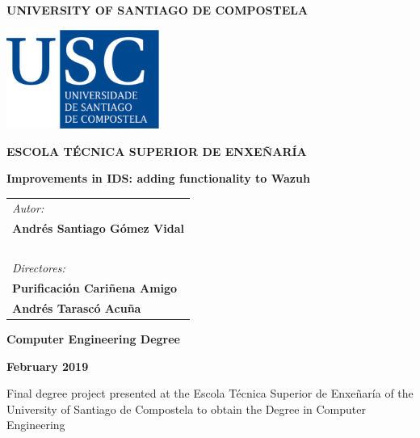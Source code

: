 \pagestyle{empty}
\begin{center}
{\bf\Large UNIVERSITY OF SANTIAGO DE COMPOSTELA}

\vspace{0.5cm}
\includegraphics[width=5cm]{figuras/logo_usc.eps}

\vspace{0.5cm}
{\bf\large ESCOLA TÉCNICA SUPERIOR DE ENXEÑARÍA}

\vspace{2cm}
{\bf\LARGE Improvements in IDS: adding functionality to Wazuh}

\end{center}

\vspace{2cm}
\hspace{4cm}\begin{tabular}{l}
{\it\Large Autor:} \\
{\bf\Large Andrés Santiago Gómez Vidal} \\
~ \\
{\it\Large Directores:} \\
{\bf\Large Purificación Cariñena Amigo} \\
{\bf\Large Andrés Tarascó Acuña} \\
\end{tabular}

\vspace{2cm}
\begin{center}
{\bf\Large Computer Engineering Degree}

\vspace{0.5cm}
{\bf\large February 2019}

\vspace{0.5cm}
Final degree project presented at the Escola Técnica Superior de Enxeñaría of the University of Santiago de Compostela to obtain the Degree in Computer Engineering
\end{center}

